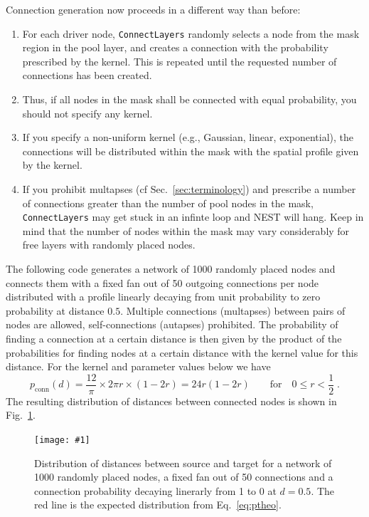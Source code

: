 \documentclass[a4paper,12pt]{report}
\newcommand{\scriptfig}[4]{%
\begin{figure}
\centerline{\texttt{[image: \#1]}}
\caption[#3]{#4}
\label{fig:#1}
\end{figure}%
}
\begin{document}
Connection generation now proceeds in a different way than before:
\begin{enumerate}
\item For each driver node, \lstinline!ConnectLayers! randomly selects
  a node from the mask region in the pool layer, and creates a
  connection with the probability prescribed by the kernel. This is
  repeated until the requested number of connections has been created.
\item Thus, if all nodes in the mask shall be connected with equal
  probability, you should not specify any kernel. 
\item If you specify a non-uniform kernel (e.g., Gaussian, linear,
  exponential), the connections will be distributed within the mask
  with the spatial profile given by the kernel.
\item If you prohibit multapses (cf Sec.~\ref{sec:terminology}) and
  prescribe a number of connections greater than the number of pool nodes
  in the mask, \lstinline!ConnectLayers! may get stuck in an infinte
  loop and NEST will hang. Keep in
  mind that the number of nodes within the mask may vary considerably
  for free layers with randomly placed nodes. 
\end{enumerate}

The following code generates a network of 1000 randomly placed nodes
and connects them with a fixed fan out of 50 outgoing connections per
node distributed with a profile linearly decaying from unit
probability to zero probability at distance $0.5$. Multiple
connections (multapses) between pairs of nodes are allowed,
self-connections (autapses) prohibited. The probability of finding a
connection at a certain distance is then given by the product of the
probabilities for finding nodes at a certain distance with the kernel
value for this distance. For the kernel and parameter values below we have
\begin{equation}
p_{\text{conn}}(d) = \frac{12}{\pi} \times 2\pi r \times (1-2r)
 = 24 r (1-2r) \qquad \text{for} \quad 0\le r < \frac{1}{2}\;.
\label{eq:ptheo}
\end{equation}
 The resulting
distribution of distances between connected nodes is shown in
Fig.~\ref{fig:conn6}.

\scriptfig{conn6}{0.5}{Distribution of connection distances}%
{Distribution of distances between source and target for a network of
  1000 randomly placed nodes, a fixed fan out of 50 connections and a
  connection probability decaying linerarly from 1 to 0 at
  $d=0.5$. The red line is the expected distribution from Eq.~\ref{eq:ptheo}.}
\end{document}
